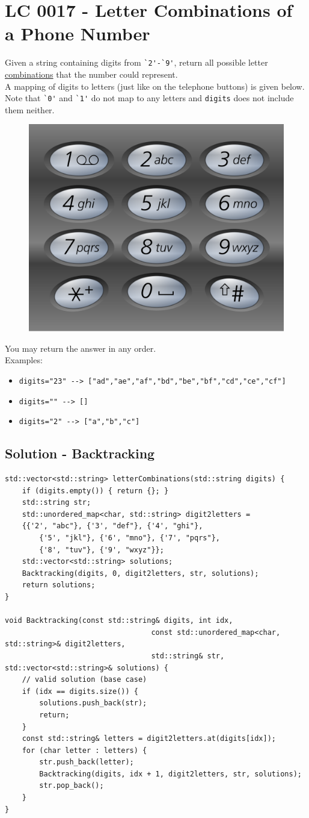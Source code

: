 \section{LC 0017 - Letter Combinations of a Phone Number}
Given a string containing digits from {\colorbox{CodeBackground}{\lstinline|`2'-`9'|}}, return all possible letter \ul{combinations} that the number could represent. \\

A mapping of digits to letters (just like on the telephone buttons) is given below. Note that {\colorbox{CodeBackground}{\lstinline|`0'|}} and {\colorbox{CodeBackground}{\lstinline|`1'|}} do not map to any letters and {\colorbox{CodeBackground}{\lstinline|digits|}} does not include them neither.

\begin{figure}[H]
	\centering
	\includegraphics[width=0.3\linewidth]{images/lc0029}
	\label{fig:lc0029}
\end{figure}

You may return the answer in any order.\\

Examples:
\begin{itemize}
	\item {\colorbox{CodeBackground}{\lstinline|digits="23" --> ["ad","ae","af","bd","be","bf","cd","ce","cf"]|}}
	\item {\colorbox{CodeBackground}{\lstinline|digits="" --> []|}}
	\item {\colorbox{CodeBackground}{\lstinline|digits="2" --> ["a","b","c"]|}}
\end{itemize}

\subsection*{Solution - Backtracking}
\begin{lstlisting}
std::vector<std::string> letterCombinations(std::string digits) {
	if (digits.empty()) { return {}; }
	std::string str;
	std::unordered_map<char, std::string> digit2letters = 
	{{'2', "abc"}, {'3', "def"}, {'4', "ghi"},
		{'5', "jkl"}, {'6', "mno"}, {'7', "pqrs"},
		{'8', "tuv"}, {'9', "wxyz"}};
	std::vector<std::string> solutions;
	Backtracking(digits, 0, digit2letters, str, solutions);
	return solutions;
}

void Backtracking(const std::string& digits, int idx,
								  const std::unordered_map<char, std::string>& digit2letters, 
								  std::string& str, std::vector<std::string>& solutions) {
	// valid solution (base case)
	if (idx == digits.size()) {
		solutions.push_back(str);
		return;
	}
	const std::string& letters = digit2letters.at(digits[idx]);
	for (char letter : letters) {
		str.push_back(letter);
		Backtracking(digits, idx + 1, digit2letters, str, solutions);
		str.pop_back();
	}
}
\end{lstlisting}\mbox{}

